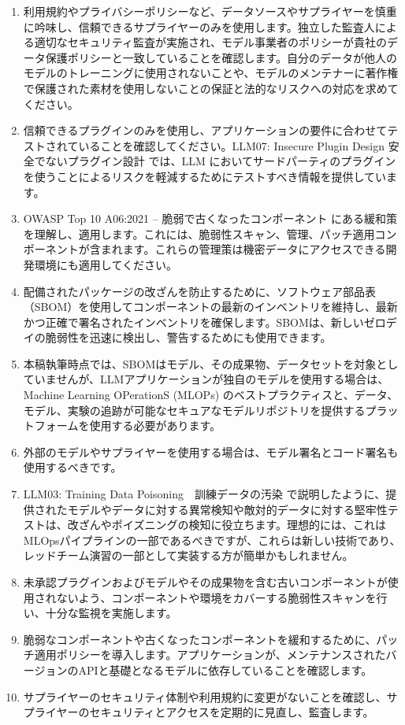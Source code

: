 \documentclass[
]{article}
\providecommand{\tightlist}{%
  \setlength{\itemsep}{0pt}\setlength{\parskip}{0pt}}
\begin{document}
\begin{enumerate}
\def\labelenumi{\arabic{enumi}.}
\tightlist
\item
  利用規約やプライバシーポリシーなど、データソースやサプライヤーを慎重に吟味し、信頼できるサプライヤーのみを使用します。独立した監査人による適切なセキュリティ監査が実施され、モデル事業者のポリシーが貴社のデータ保護ポリシーと一致していることを確認します。自分のデータが他人のモデルのトレーニングに使用されないことや、モデルのメンテナーに著作権で保護された素材を使用しないことの保証と法的なリスクへの対応を求めてください。
\item
  信頼できるプラグインのみを使用し、アプリケーションの要件に合わせてテストされていることを確認してください。LLM07:
  Insecure Plugin Design 安全でないプラグイン設計 では、LLM
  においてサードパーティのプラグインを使うことによるリスクを軽減するためにテストすべき情報を提供しています。
\item
  OWASP Top 10 A06:2021 -- 脆弱で古くなったコンポーネント
  にある緩和策を理解し、適用します。これには、脆弱性スキャン、管理、パッチ適用コンポーネントが含まれます。これらの管理策は機密データにアクセスできる開発環境にも適用してください。
\item
  配備されたパッケージの改ざんを防止するために、ソフトウェア部品表（SBOM）を使用してコンポーネントの最新のインベントリを維持し、最新かつ正確で署名されたインベントリを確保します。SBOMは、新しいゼロデイの脆弱性を迅速に検出し、警告するためにも使用できます。
\item
  本稿執筆時点では、SBOMはモデル、その成果物、データセットを対象としていませんが、LLMアプリケーションが独自のモデルを使用する場合は、Machine
  Learning OPerationS (MLOPs)
  のベストプラクティスと、データ、モデル、実験の追跡が可能なセキュアなモデルリポジトリを提供するプラットフォームを使用する必要があります。
\item
  外部のモデルやサプライヤーを使用する場合は、モデル署名とコード署名も使用するべきです。
\item
  LLM03: Training Data Poisoning　訓練データの汚染
  で説明したように、提供されたモデルやデータに対する異常検知や敵対的データに対する堅牢性テストは、改ざんやポイズニングの検知に役立ちます。理想的には、これはMLOpsパイプラインの一部であるべきですが、これらは新しい技術であり、レッドチーム演習の一部として実装する方が簡単かもしれません。
\item
  未承認プラグインおよびモデルやその成果物を含む古いコンポーネントが使用されないよう、コンポーネントや環境をカバーする脆弱性スキャンを行い、十分な監視を実施します。
\item
  脆弱なコンポーネントや古くなったコンポーネントを緩和するために、パッチ適用ポリシーを導入します。アプリケーションが、メンテナンスされたバージョンのAPIと基礎となるモデルに依存していることを確認します。
\item
  サプライヤーのセキュリティ体制や利用規約に変更がないことを確認し、サプライヤーのセキュリティとアクセスを定期的に見直し、監査します。
\end{enumerate}
\end{document}
